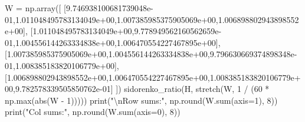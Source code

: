\documentclass[
  letterpaper,
  DIV=11,
  numbers=noendperiod]{scrartcl}
\newenvironment{Shaded}{\begin{snugshade}}{\end{snugshade}}
\newcommand{\BuiltInTok}[1]{\textcolor[rgb]{0.00,0.23,0.31}{#1}}
\newcommand{\CharTok}[1]{\textcolor[rgb]{0.13,0.47,0.30}{#1}}
\newcommand{\DecValTok}[1]{\textcolor[rgb]{0.68,0.00,0.00}{#1}}
\newcommand{\FloatTok}[1]{\textcolor[rgb]{0.68,0.00,0.00}{#1}}
\newcommand{\NormalTok}[1]{\textcolor[rgb]{0.00,0.23,0.31}{#1}}
\newcommand{\OperatorTok}[1]{\textcolor[rgb]{0.37,0.37,0.37}{#1}}
\newcommand{\StringTok}[1]{\textcolor[rgb]{0.13,0.47,0.30}{#1}}
\begin{document}
\begin{Shaded}
\begin{Highlighting}[]
\NormalTok{W }\OperatorTok{=}\NormalTok{ np.array([}
\NormalTok{  [}\FloatTok{9.746938100681739048e{-}01}\NormalTok{,}\FloatTok{1.011048495783134049e+00}\NormalTok{,}\FloatTok{1.007385985375905069e+00}\NormalTok{,}\FloatTok{1.006898802943898552e+00}\NormalTok{],}
\NormalTok{[}\FloatTok{1.011048495783134049e+00}\NormalTok{,}\FloatTok{9.778949562160562659e{-}01}\NormalTok{,}\FloatTok{1.004556144263334838e+00}\NormalTok{,}\FloatTok{1.006470554227467895e+00}\NormalTok{],}
\NormalTok{[}\FloatTok{1.007385985375905069e+00}\NormalTok{,}\FloatTok{1.004556144263334838e+00}\NormalTok{,}\FloatTok{9.796630669374898348e{-}01}\NormalTok{,}\FloatTok{1.008385183820106779e+00}\NormalTok{],}
\NormalTok{[}\FloatTok{1.006898802943898552e+00}\NormalTok{,}\FloatTok{1.006470554227467895e+00}\NormalTok{,}\FloatTok{1.008385183820106779e+00}\NormalTok{,}\FloatTok{9.782578339505850762e{-}01}\NormalTok{]}
\NormalTok{])}
\NormalTok{sidorenko\_ratio(H, stretch(W, }\DecValTok{1} \OperatorTok{/}\NormalTok{ (}\DecValTok{60} \OperatorTok{*}\NormalTok{ np.}\BuiltInTok{max}\NormalTok{(}\BuiltInTok{abs}\NormalTok{(W }\OperatorTok{{-}} \DecValTok{1}\NormalTok{)))))}
\BuiltInTok{print}\NormalTok{(}\StringTok{"}\CharTok{\textbackslash{}n}\StringTok{Row sums:"}\NormalTok{, np.}\BuiltInTok{round}\NormalTok{(W.}\BuiltInTok{sum}\NormalTok{(axis}\OperatorTok{=}\DecValTok{1}\NormalTok{), }\DecValTok{8}\NormalTok{))}
\BuiltInTok{print}\NormalTok{(}\StringTok{"Col sums:"}\NormalTok{, np.}\BuiltInTok{round}\NormalTok{(W.}\BuiltInTok{sum}\NormalTok{(axis}\OperatorTok{=}\DecValTok{0}\NormalTok{), }\DecValTok{8}\NormalTok{))}


\end{Highlighting}
\end{Shaded}
\end{document}
